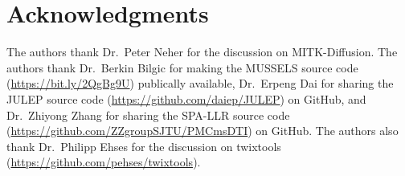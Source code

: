 \documentclass[preprint,12pt,authoryear,review]{elsarticle}
\begin{document}
    \section*{Acknowledgments}

    The authors thank Dr.~Peter Neher for the discussion on MITK-Diffusion.
    The authors thank
    Dr.~Berkin Bilgic for making the MUSSELS source code
    (\url{https://bit.ly/2QgBg9U}) publically available,
    Dr.~Erpeng Dai for sharing the JULEP source code
    (\url{https://github.com/daiep/JULEP}) on GitHub,
    and Dr.~Zhiyong Zhang for sharing the SPA-LLR source code
    (\url{https://github.com/ZZgroupSJTU/PMCmsDTI}) on GitHub.
    The authors also thank Dr.~Philipp Ehses for the discussion on
    twixtools (\url{https://github.com/pehses/twixtools}).

    
\end{document}
